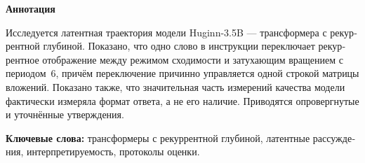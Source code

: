 \documentclass{zapiski}
\begin{document}
\begin{center}
\begin{minipage}{0.88\textwidth}
\small
\begin{center}\foreignlanguage{russian}{\textbf{Аннотация}}\end{center}
\foreignlanguage{russian}{Исследуется латентная траектория модели Huginn-3.5B --- трансформера
с рекуррентной глубиной. Показано, что одно слово в инструкции переключает рекуррентное
отображение между режимом сходимости и затухающим вращением с периодом~6, причём переключение
причинно управляется одной строкой матрицы вложений. Показано также, что значительная часть
измерений качества модели фактически измеряла формат ответа, а не его наличие. Приводятся
опровергнутые и уточнённые утверждения.}

\vspace{0.5em}
\noindent\foreignlanguage{russian}{\textbf{Ключевые слова:} трансформеры с рекуррентной
глубиной, латентные рассуждения, интерпретируемость, протоколы оценки.}
\end{minipage}
\end{center}
\end{document}
